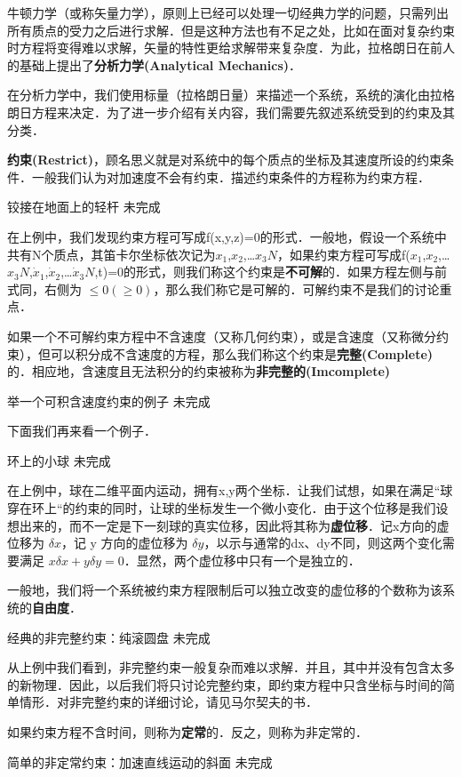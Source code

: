 
\begin{issues}
\issueDraft
\issueTODO
\end{issues}


牛顿力学（或称矢量力学），原则上已经可以处理一切经典力学的问题，只需列出所有质点的受力之后进行求解．但是这种方法也有不足之处，比如在面对复杂约束时方程将变得难以求解，矢量的特性更给求解带来复杂度．为此，拉格朗日在前人的基础上提出了\textbf{分析力学(Analytical Mechanics)}．

在分析力学中，我们使用标量（拉格朗日量）来描述一个系统，系统的演化由拉格朗日方程来决定．为了进一步介绍有关内容，我们需要先叙述系统受到的约束及其分类．

\textbf{约束(Restrict)}，顾名思义就是对系统中的每个质点的坐标及其速度所设的约束条件．一般我们认为对加速度不会有约束．描述约束条件的方程称为约束方程．

\begin{example}{铰接在地面上的轻杆}
未完成
\end{example}

在上例中，我们发现约束方程可写成f(x,y,z)=0的形式．一般地，假设一个系统中共有N个质点，其笛卡尔坐标依次记为$x
_1$,$x_2$,…$x_3N$，如果约束方程可写成f($x_1$,$x_2$,…$x_3N$,$\dot x_1$,$\dot x_2$,…$\dot x_3N$,t)=0的形式，则我们称这个约束是\textbf{不可解}的．如果方程左侧与前式同，右侧为 $\leq 0(\geqslant 0)$，那么我们称它是可解的．可解约束不是我们的讨论重点．

如果一个不可解约束方程中不含速度（又称几何约束），或是含速度（又称微分约束），但可以积分成不含速度的方程，那么我们称这个约束是\textbf{完整(Complete)}的．相应地，含速度且无法积分的约束被称为\textbf{非完整的(Imcomplete)}

\begin{example}{举一个可积含速度约束的例子}
未完成
\end{example}

下面我们再来看一个例子．

\begin{example}{环上的小球}
未完成
\end{example}

在上例中，球在二维平面内运动，拥有x,y两个坐标．让我们试想，如果在满足“球穿在环上“的约束的同时，让球的坐标发生一个微小变化．由于这个位移是我们设想出来的，而不一定是下一刻球的真实位移，因此将其称为\textbf{虚位移}．记x方向的虚位移为 $\delta x$，记 y 方向的虚位移为 $\delta y$，以示与通常的dx、dy不同，则这两个变化需要满足 $x\delta x+y\delta y=0$．显然，两个虚位移中只有一个是独立的．

一般地，我们将一个系统被约束方程限制后可以独立改变的虚位移的个数称为该系统的\textbf{自由度}．

\begin{example}{经典的非完整约束：纯滚圆盘}
未完成
\end{example}

从上例中我们看到，非完整约束一般复杂而难以求解．并且，其中并没有包含太多的新物理．因此，以后我们将只讨论完整约束，即约束方程中只含坐标与时间的简单情形．对非完整约束的详细讨论，请见马尔契夫的书．

如果约束方程不含时间，则称为\textbf{定常}的．反之，则称为非定常的．

\begin{example}{简单的非定常约束：加速直线运动的斜面}
未完成
\end{example}